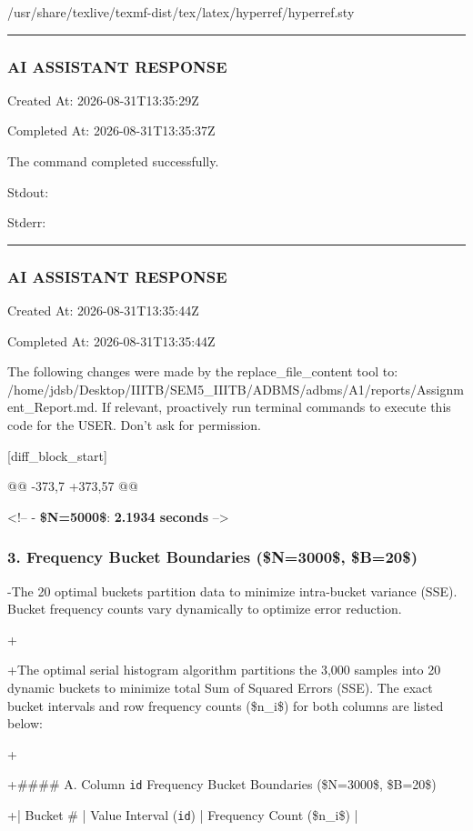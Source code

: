 \documentclass[11pt,a4paper]{article}
\begin{document}
{/usr/share/texlive/texmf-dist/tex/latex/hyperref/hyperref.sty


\hrule

\subsubsection{AI ASSISTANT RESPONSE}

Created At: 2026-08-31T13:35:29Z

Completed At: 2026-08-31T13:35:37Z


The command completed successfully.

Stdout:


Stderr:


\hrule

\subsubsection{AI ASSISTANT RESPONSE}

Created At: 2026-08-31T13:35:44Z

Completed At: 2026-08-31T13:35:44Z

The following changes were made by the replace\_file\_content tool to: /home/jdsb/Desktop/IIITB/SEM5\_IIITB/ADBMS/adbms/A1/reports/Assignment\_Report.md. If relevant, proactively run terminal commands to execute this code for the USER. Don't ask for permission.

[diff\_block\_start]

@@ -373,7 +373,57 @@

<!-- - \textbf{\$N=5000\$}: \textbf{2.1934 seconds} -->


\subsubsection{3. Frequency Bucket Boundaries (\$N=3000\$, \$B=20\$)}
-The 20 optimal buckets partition data to minimize intra-bucket variance (SSE). Bucket frequency counts vary dynamically to optimize error reduction.

+

+The optimal serial histogram algorithm partitions the 3,000 samples into 20 dynamic buckets to minimize total Sum of Squared Errors (SSE). The exact bucket intervals and row frequency counts (\$n\_i\$) for both columns are listed below:

+

+\#\#\#\# A. Column \texttt{id} Frequency Bucket Boundaries (\$N=3000\$, \$B=20\$)

+| Bucket \# | Value Interval (\texttt{id}) | Frequency Count (\$n\_i\$) |

}
\end{document}
